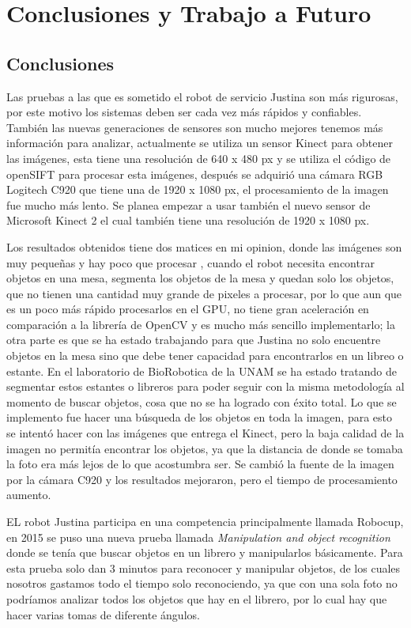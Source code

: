  
 
 \chapter{Conclusiones y Trabajo a Futuro}

\section{Conclusiones}

 Las pruebas a las que es sometido el robot de servicio Justina son más rigurosas, por este motivo los sistemas deben ser cada vez más rápidos y confiables. También las nuevas generaciones de sensores son mucho mejores tenemos más información para analizar, actualmente se utiliza un sensor Kinect para obtener las imágenes, esta tiene una resolución de  640 x 480 px y se utiliza el código de openSIFT para procesar esta imágenes, después     se adquirió una cámara RGB Logitech C920 que tiene una  de 1920 x 1080 px, el procesamiento de la imagen fue mucho más lento. Se planea empezar a usar también el nuevo sensor de Microsoft Kinect 2 el cual también tiene una resolución de 1920 x 1080 px. 
 
 
 Los resultados obtenidos tiene dos matices en mi opinion, donde las imágenes son muy pequeñas y hay poco que procesar , cuando el robot necesita encontrar objetos en una mesa, segmenta los objetos de la mesa y quedan solo los objetos, que no tienen una cantidad muy grande de pixeles a procesar, por lo que aun que es un poco más rápido procesarlos en el GPU, no tiene gran aceleración en comparación a la librería de OpenCV y es mucho más sencillo implementarlo; la otra parte es que se ha estado trabajando para que Justina no solo encuentre objetos en la mesa sino que debe tener capacidad para encontrarlos en un libreo o estante. En el laboratorio de BioRobotica de la UNAM  se ha estado tratando de segmentar estos estantes o libreros para poder seguir con la misma metodología al momento de buscar objetos, cosa que no se ha logrado con éxito total. Lo que se implemento fue hacer una búsqueda de los objetos en toda la imagen, para esto se intentó hacer con las imágenes que entrega el Kinect, pero la baja calidad de la imagen no permitía encontrar los objetos, ya que la distancia de donde se tomaba la foto era más lejos de lo que acostumbra ser.
 Se cambió la fuente de la imagen por la cámara C920 y los resultados mejoraron, pero el tiempo de procesamiento aumento.

 EL robot Justina participa en una competencia principalmente llamada Robocup, en 2015 se puso una nueva prueba llamada  \textit{Manipulation and object recognition} donde se tenía que buscar objetos en un librero y manipularlos básicamente. Para esta prueba solo dan 3 minutos para reconocer y manipular objetos,  de los cuales nosotros gastamos todo el tiempo solo reconociendo, ya que con una sola foto no podríamos analizar todos los objetos que  hay en el librero, por lo cual hay que hacer varias tomas de diferente ángulos.


